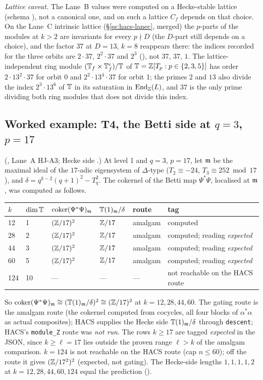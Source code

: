 \emph{Lattice caveat.} The Lane~B values were computed on a Hecke-stable lattice (schema ), not a
canonical one, and on such a lattice $C_f$ depends on that choice. On the Lane~C intrinsic lattice (\S\ref{ss:hacs-lanec},
merged) the $p$-parts of the modules at $k>2$ are invariants for every $p\nmid D$ (the $D$-part still depends on a choice), and the factor $37$ at $D=13$, $k=8$ reappears there: the indices recorded for the three orbits are $2\cdot37$, $2^2\cdot37$ and $2^3$ (), not $37$, $37$, $1$. The lattice-independent ring module $(\mathbb{T}_f\times\mathbb{T}_f^c)/\mathbb{T}$ of
$\mathbb{T}=\mathbb{Z}[T_p:p\in\{2,3,5\}]$ has order $2\cdot13^2\cdot37$ for orbit 0 and $2^2\cdot13^4\cdot37$ for orbit 1; the primes $2$ and $13$
also divide the index $2^3\cdot13^6$ of $\mathbb{T}$ in its saturation in $\mathrm{End}_{\mathbb{Z}}(L)$, and $37$ is the only prime dividing both ring modules that does not divide this index.

\subsection{Worked example: T4, the Betti side at $q=3$, $p=17$}\label{ss:hacs-t4}
(, Lane~A HJ-A3; Hecke side .) At level 1 and $q=3$, $p=17$, let $\mathfrak{m}$ be the
maximal ideal of the $17$-adic eigensystem of $\Delta$-type ($T_2\equiv-24$, $T_3\equiv252\bmod17$), and
$\delta=q^{k-2}(q+1)^2-T_q^2$. The cokernel of the Betti map $\Psi^*\Psi$, localised at $\mathfrak{m}$, was computed as follows.
\begin{center}\small
\begin{tabular}{@{}llllll@{}}\toprule
$k$ & $\dim\mathbb{T}$ & $\operatorname{coker}(\Psi^*\Psi)_{\mathfrak{m}}$ & $\mathbb{T}(1)_{\mathfrak{m}}/\delta$ & route & tag\\\midrule
12 & 1 & $(\mathbb{Z}/17)^2$ & $\mathbb{Z}/17$ & amalgam & computed\\
28 & 2 & $(\mathbb{Z}/17)^2$ & $\mathbb{Z}/17$ & amalgam & computed; reading \emph{expected}\\
44 & 3 & $(\mathbb{Z}/17)^2$ & $\mathbb{Z}/17$ & amalgam & computed; reading \emph{expected}\\
60 & 5 & $(\mathbb{Z}/17)^2$ & $\mathbb{Z}/17$ & amalgam & computed; reading \emph{expected}\\
124 & 10 & --- & --- & --- & not reachable on the HACS route\\\bottomrule
\end{tabular}
\end{center}
So $\operatorname{coker}(\Psi^*\Psi)_{\mathfrak{m}}\cong(\mathbb{T}(1)_{\mathfrak{m}}/\delta)^2\cong(\mathbb{Z}/17)^2$ at $k=12,28,44,60$. The gating route is the amalgam route (the
cokernel computed from cocycles, all four blocks of $\alpha^*\alpha$ as actual composites); HACS supplies the Hecke side $\mathbb{T}(1)_{\mathfrak{m}}/\delta$ through
\texttt{descent}; HACS's \texttt{module\_Z} route was \emph{not run}. The rows $k\ge17$ are tagged \emph{expected} in the
JSON, since $k\ge\ell=17$ lies outside the proven range $\ell>k$ of the amalgam comparison. $k=124$ is not reachable on the
HACS route (cap $n\le60$); off the route it gives $(\mathbb{Z}/17^2)^2$ (expected, not gating). The Hecke-side lengths
$1,1,1,1,2$ at $k=12,28,44,60,124$ equal the prediction ().


